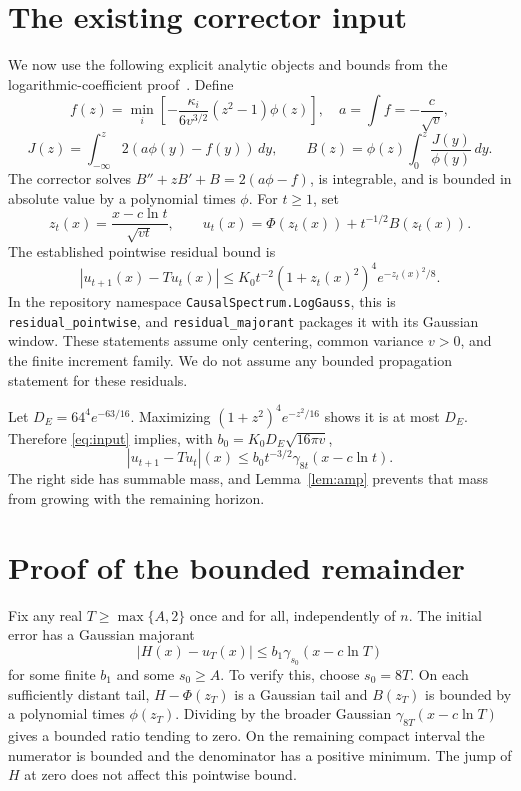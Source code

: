 \documentclass[11pt]{article}
\begin{document}
\section{The existing corrector input}
We now use the following explicit analytic objects and bounds from
the logarithmic-coefficient proof~\cite{sharp,repo}. Define
\[
 f(z)=\min_i\left[-\frac{\kappa_i}{6v^{3/2}}(z^2-1)\phi(z)\right],
 \quad a=\int f=-\frac{c}{\sqrt v},
\]
\[
 J(z)=\int_{-\infty}^z2(a\phi(y)-f(y))\,dy,\qquad
 B(z)=\phi(z)\int_0^z\frac{J(y)}{\phi(y)}\,dy.
\]
The corrector solves $B''+zB'+B=2(a\phi-f)$, is integrable,
and is bounded in absolute value by a polynomial times $\phi$.
For $t\ge1$, set
\[
 z_t(x)=\frac{x-c\ln t}{\sqrt{vt}},\qquad
 u_t(x)=\Phi(z_t(x))+t^{-1/2}B(z_t(x)).
\]
The established pointwise residual bound is
\begin{equation}\label{eq:input}
 |u_{t+1}(x)-Tu_t(x)|
 \le K_0t^{-2}(1+z_t(x)^2)^4e^{-z_t(x)^2/8}.
\end{equation}
In the repository namespace \texttt{CausalSpectrum.LogGauss}, this is
\texttt{residual\_pointwise}, and
\texttt{residual\_majorant} packages it with its Gaussian window.
These statements assume only centering, common variance $v>0$,
and the finite increment family. We do not assume any bounded
propagation statement for these residuals.

Let $D_E=64^4e^{-63/16}$. Maximizing
$(1+z^2)^4e^{-z^2/16}$ shows it is at most $D_E$. Therefore
\eqref{eq:input} implies, with $b_0=K_0D_E\sqrt{16\pi v}$,
\begin{equation}\label{eq:gaussres}
 |u_{t+1}-Tu_t|(x)
 \le b_0t^{-3/2}\gamma_{8t}(x-c\ln t).
\end{equation}
The right side has summable mass, and Lemma~\ref{lem:amp} prevents
that mass from growing with the remaining horizon.

\section{Proof of the bounded remainder}
Fix any real $T\ge\max\{A,2\}$ once and for all, independently of $n$.
The initial error has a Gaussian majorant
\begin{equation}\label{eq:initial}
 |H(x)-u_T(x)|\le b_1\gamma_{s_0}(x-c\ln T)
\end{equation}
for some finite $b_1$ and some $s_0\ge A$.
To verify this, choose $s_0=8T$. On each sufficiently distant tail,
$H-\Phi(z_T)$ is a Gaussian tail and $B(z_T)$ is bounded by a
polynomial times $\phi(z_T)$. Dividing by the broader Gaussian
$\gamma_{8T}(x-c\ln T)$ gives a bounded ratio tending to zero.
On the remaining compact interval the numerator is bounded and
the denominator has a positive minimum. The jump of $H$ at zero
does not affect this pointwise bound.
\end{document}
